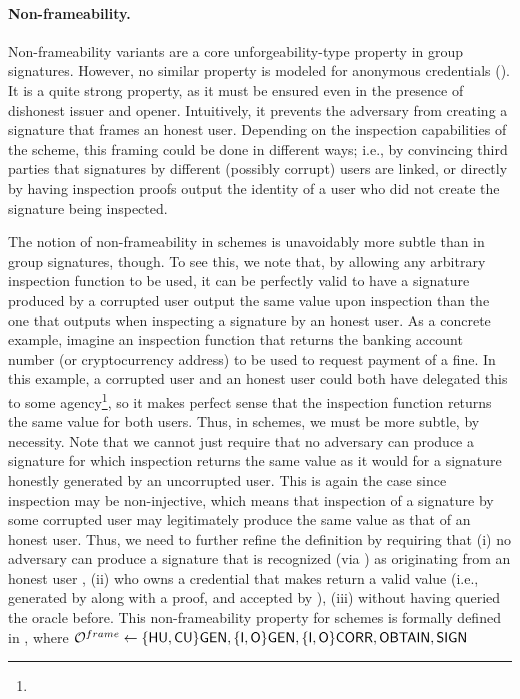 \paragraph{Non-frameability.} %
Non-frameability variants are a core unforgeability-type property in group
signatures. However, no
similar property is modeled for anonymous credentials (). It is a quite strong
property, as it must be ensured even in the presence of dishonest issuer and
opener. Intuitively, it prevents the adversary from creating a signature that
frames an honest user. Depending on the inspection capabilities of the scheme,
this framing could be done in different ways; i.e., by convincing third parties
that signatures by different (possibly corrupt) users are linked, or directly
by having inspection proofs output the identity of a user who did not create the
signature being inspected.

The notion of non-frameability in \UAS schemes is unavoidably more subtle than
in group signatures, though. To see this, we note that, by allowing any
arbitrary inspection function \finsp to be used, it can be perfectly valid to
have a signature produced by a corrupted user output the same \y value upon
inspection than the one that \finsp outputs when inspecting a signature by an
honest user. As a concrete example, imagine an inspection function that returns
the banking account number (or cryptocurrency address) to be used to request
payment of a fine. In this example, a corrupted user and an honest user could
both have delegated this to some agency\footnote{}, so it makes perfect sense
that the inspection function returns the same value for both users.
%
Thus, in \UAS schemes, we must be more subtle, by necessity. Note that we cannot
just require that no adversary can produce a signature for which inspection
returns the same value as it would for a signature honestly generated by an
uncorrupted user. This is again the case since inspection may be non-injective,
which means that inspection of a signature by some corrupted user may
legitimately produce the same value as that of an honest user. Thus, we need
to further refine the definition by requiring that (i) no adversary can produce
a signature that is recognized (via \Identify) as originating from an honest
user \uid, (ii) who owns a credential that makes \finsp return a valid \y value
(i.e., generated by \Inspect along with a proof, and accepted by \Judge), (iii)
without having queried the \SIGN oracle before. This non-frameability property
for \UAS schemes is formally defined in , where
$\mathcal{O}^{frame} \gets \lbrace\mathsf{HU},\mathsf{CU}\rbrace\mathsf{GEN},
\lbrace\mathsf{I},\mathsf{O}\rbrace\mathsf{GEN},\lbrace\mathsf{I},\mathsf{O}\rbrace\mathsf{CORR},\mathsf{OBTAIN},\mathsf{SIGN}$

